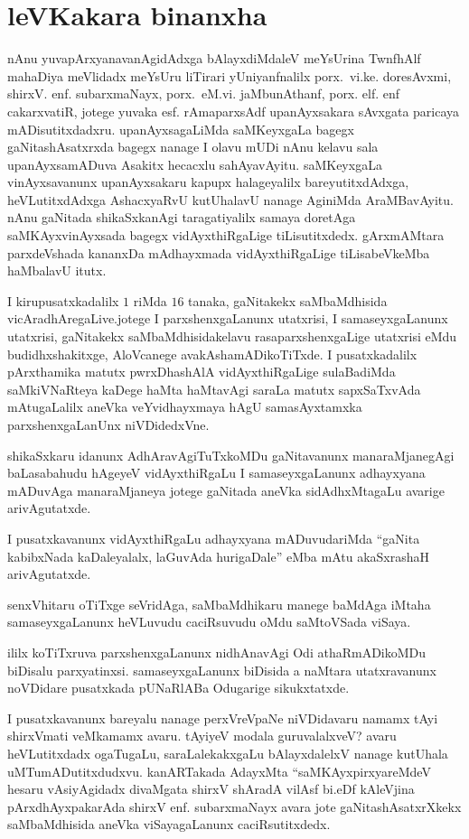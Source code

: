  \chapter*{leVKakara binanxha}

\qquad nAnu yuvapArxyanavanAgidAdxga  bAlayxdiMdaleV meYsUrina TwnfhAlf mahaDiya meVlidadx meYsUru liTirari yUniyanfnalilx porx.~vi.ke. doresAvxmi, shirxV. enf. subarxmaNayx, porx.~eM.vi. jaMbunAthanf, porx. elf. enf cakarxvatiR, jotege yuvaka esf. rAmaparxsAdf upanAyxsakara sAvxgata paricaya mADisutitxdadxru.  upanAyxsagaLiMda saMKeyxgaLa bagegx gaNitashAsatxrxda bagegx nanage I olavu mUDi nAnu kelavu sala upanAyxsamADuva Asakitx hecacxlu sahAyavAyitu. saMKeyxgaLa vinAyxsavanunx upanAyxsakaru kapupx halageyalilx bareyutitxdAdxga, heVLutitxdAdxga AshacxyaRvU kutUhalavU nanage AginiMda AraMBavAyitu. nAnu gaNitada shikaSxkanAgi taragatiyalilx samaya doretAga saMKAyxvinAyxsada bagegx vidAyxthiRgaLige tiLisutitxdedx. gArxmAMtara parxdeVshada kananxDa mAdhayxmada vidAyxthiRgaLige tiLisabeVkeMba haMbalavU itutx.

 I kirupusatxkadalilx $1$ riMda $16$ tanaka, gaNitakekx saMbaMdhisida vicAradhAregaLive.\break jotege I parxshenxgaLanunx utatxrisi, I samaseyxgaLanunx utatxrisi, gaNitakekx saMbaMdhisida\break kelavu rasaparxshenxgaLige utatxrisi eMdu budidhxshakitxge, AloVcanege avakAshamADi\break koTiTxde. I pusatxkadalilx pArxthamika matutx pwrxDhashAlA vidAyxthiRgaLige sulaBadiMda saMkiVNaRteya kaDege haMta haMtavAgi saraLa matutx sapxSaTxvAda mAtugaLalilx aneVka veYvidhayxmaya hAgU samasAyxtamxka parxshenxgaLanUnx niVDidedxVne.

 shikaSxkaru idanunx AdhAravAgiTuTxkoMDu gaNitavanunx manaraMjanegAgi baLasa\-bahudu hAgeyeV vidAyxthiRgaLu I samaseyxgaLanunx adhayxyana mADuvAga manaraMjaneya jotege gaNitada aneVka sidAdhxMtagaLu avarige arivAgutatxde.

 I pusatxkavanunx vidAyxthiRgaLu adhayxyana mADuvudariMda ``gaNita kabibxNada kaDaleyalalx, laGuvAda hurigaDale'' eMba mAtu akaSxrashaH arivAgutatxde.

 senxVhitaru oTiTxge seVridAga, saMbaMdhikaru manege baMdAga iMtaha samaseyxgaLanunx heVLuvudu caciRsuvudu oMdu saMtoVSada viSaya.

  ililx koTiTxruva parxshenxgaLanunx nidhAnavAgi Odi athaRmADikoMDu biDisalu parxyatinxsi. samaseyxgaLanunx biDisida a naMtara utatxravanunx noVDidare pusatxkada pUNaRlABa Odugarige sikukxtatxde.

 I pusatxkavanunx bareyalu nanage perxVreVpaNe niVDidavaru namamx tAyi shirxVmati veMkamamx avaru. tAyiyeV modala guruvalalxveV? avaru heVLutitxdadx ogaTugaLu, saraLalekakxgaLu bAlayxdalelxV nanage kutUhala uMTumADutitxdudxvu. kanARTakada AdayxMta ``saMKAyxpirxyareMdeV hesaru vAsiyAgidadx divaMgata shirxV shAradA vilAsf bi.eDf kAleVjina pArxdhAyxpakarAda shirxV enf. subarxmaNayx avara jote gaNitashAsatxrXkekx saMbaMdhisida aneVka viSayagaLanunx caciRsutitxdedx.

